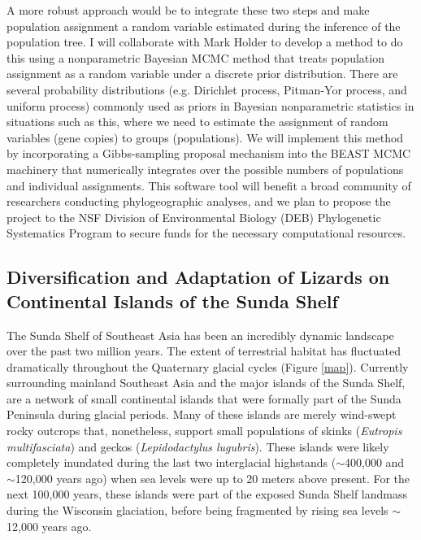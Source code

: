 \documentclass[10pt]{article}
\begin{document}
A more robust approach would be to integrate these two steps and make
population assignment a random variable estimated during the inference of the
population tree.
I will collaborate with Mark Holder to develop a method to do this using a
nonparametric Bayesian MCMC method that treats population assignment as a
random variable under a discrete prior distribution.
There are several probability distributions (e.g. Dirichlet process, Pitman-Yor
process, and uniform process) commonly used as priors in Bayesian nonparametric
statistics in situations such as this, where we need to estimate the assignment
of random variables (gene copies) to groups (populations).
We will implement this method by incorporating a Gibbs-sampling proposal
mechanism into the BEAST MCMC machinery that numerically integrates over the
possible numbers of populations and individual assignments.
This software tool will benefit a broad community of researchers conducting
phylogeographic analyses, and we plan to propose the project to the NSF
Division of Environmental Biology (DEB) Phylogenetic Systematics Program to
secure funds for the necessary computational resources.

\subsection*{Diversification and Adaptation of Lizards on Continental Islands
of the Sunda Shelf}
The Sunda Shelf of Southeast Asia has been an incredibly dynamic landscape over
the past two million years.
The extent of terrestrial habitat has fluctuated dramatically throughout the
Quaternary glacial cycles (Figure \ref{map}).
Currently surrounding mainland Southeast Asia and the major islands of the
Sunda Shelf, are a network of small continental islands that were formally part
of the Sunda Peninsula during glacial periods.
Many of these islands are merely wind-swept rocky outcrops that, nonetheless,
support small populations of skinks (\emph{Eutropis multifasciata}) and geckos
(\emph{Lepidodactylus lugubris}).
These islands were likely completely inundated during the last two
interglacial highstands ($\sim$400,000 and $\sim$120,000 years ago) when sea
levels were up to 20 meters above present.
For the next 100,000 years, these islands were part of the exposed Sunda Shelf
landmass during the Wisconsin glaciation, before being fragmented by rising sea
levels $\sim$12,000 years ago.
\end{document}
